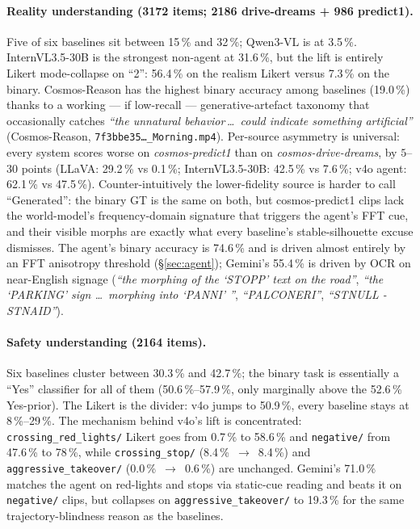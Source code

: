 \documentclass[11pt,a4paper]{article}
\newcommand{\pct}[1]{#1\,\%}
\newcommand{\code}[1]{\texttt{#1}}
\begin{document}
\paragraph{Reality understanding (3172 items; 2186 drive-dreams + 986
predict1).} Five of six baselines sit between \pct{15} and \pct{32};
Qwen3-VL is at \pct{3.5}. InternVL3.5-30B is the strongest non-agent
at \pct{31.6}, but the lift is entirely Likert mode-collapse on ``2'':
\pct{56.4} on the realism Likert versus \pct{7.3} on the binary.
Cosmos-Reason has the highest binary accuracy among baselines
(\pct{19.0}) thanks to a working --- if low-recall ---
generative-artefact taxonomy that occasionally catches \emph{``the
unnatural behavior\,\dots\ could indicate something artificial''}
(Cosmos-Reason, \code{7f3bbe35\dots\_Morning.mp4}). Per-source
asymmetry is universal: every system scores worse on
\emph{cosmos-predict1} than on \emph{cosmos-drive-dreams}, by
$5$--$30$ points (LLaVA: \pct{29.2} vs \pct{0.1}; InternVL3.5-30B:
\pct{42.5} vs \pct{7.6}; v4o agent: \pct{62.1} vs \pct{47.5}).
Counter-intuitively the lower-fidelity source is harder to call
``Generated'': the binary GT is the same on both, but cosmos-predict1
clips lack the world-model's frequency-domain signature that triggers
the agent's FFT cue, and their visible morphs are exactly what every
baseline's stable-silhouette excuse dismisses. The agent's binary
accuracy is \pct{74.6} and is driven almost entirely by an FFT
anisotropy threshold (\S\ref{sec:agent}); Gemini's \pct{55.4} is driven
by OCR on near-English signage (\emph{``the morphing of the `STOPP'
text on the road''}, \emph{``the `PARKING' sign \dots\ morphing into
`PANNI' ''}, \emph{``PALCONERI''}, \emph{``STNULL - STNAID''}).

\paragraph{Safety understanding (2164 items).} Six baselines cluster
between \pct{30.3} and \pct{42.7}; the binary task is essentially a
``Yes'' classifier for all of them (\pct{50.6}--\pct{57.9}, only
marginally above the \pct{52.6} Yes-prior). The Likert is the divider:
v4o jumps to \pct{50.9}, every baseline stays at \pct{8}--\pct{29}. The
mechanism behind v4o's lift is concentrated:
\code{crossing\_red\_lights/} Likert goes from \pct{0.7} to \pct{58.6}
and \code{negative/} from \pct{47.6} to \pct{78}, while
\code{crossing\_stop/} (\pct{8.4}~$\to$~\pct{8.4}) and
\code{aggressive\_takeover/} (\pct{0.0}~$\to$~\pct{0.6}) are unchanged.
Gemini's \pct{71.0} matches the agent on red-lights and stops via
static-cue reading and beats it on \code{negative/} clips, but
collapses on \code{aggressive\_takeover/} to \pct{19.3} for the same
trajectory-blindness reason as the baselines.
\end{document}

